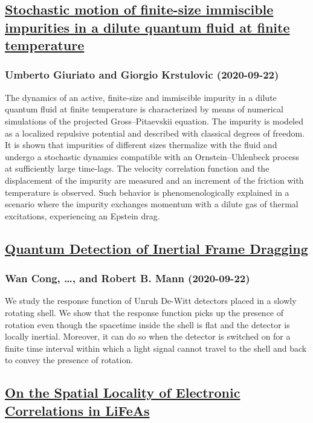 {\subsection*{\href{http://arxiv.org/abs/2009.10596v1}{Stochastic motion of finite-size immiscible impurities in a dilute  quantum fluid at finite temperature}}
\subsubsection*{Umberto Giuriato and Giorgio Krstulovic (2020-09-22)}
The dynamics of an active, finite-size and immiscible impurity in a dilute
quantum fluid at finite temperature is characterized by means of numerical
simulations of the projected Gross--Pitaevskii equation. The impurity is
modeled as a localized repulsive potential and described with classical degrees
of freedom. It is shown that impurities of different sizes thermalize with the
fluid and undergo a stochastic dynamics compatible with an Ornstein--Uhlenbeck
process at sufficiently large time-lags. The velocity correlation function and
the displacement of the impurity are measured and an increment of the friction
with temperature is observed. Such behavior is phenomenologically explained in
a scenario where the impurity exchanges momentum with a dilute gas of thermal
excitations, experiencing an Epstein drag.

\subsection*{\href{http://arxiv.org/abs/2009.10584v1}{Quantum Detection of Inertial Frame Dragging}}
\subsubsection*{Wan Cong, \dots, and Robert B. Mann (2020-09-22)}
We study the response function of Unruh De-Witt detectors placed in a slowly
rotating shell. We show that the response function picks up the presence of
rotation even though the spacetime inside the shell is flat and the detector is
locally inertial. Moreover, it can do so when the detector is switched on for a
finite time interval within which a light signal cannot travel to the shell and
back to convey the presence of rotation.

\subsection*{\href{http://arxiv.org/abs/2009.10577v1}{On the Spatial Locality of Electronic Correlations in LiFeAs}}
}

